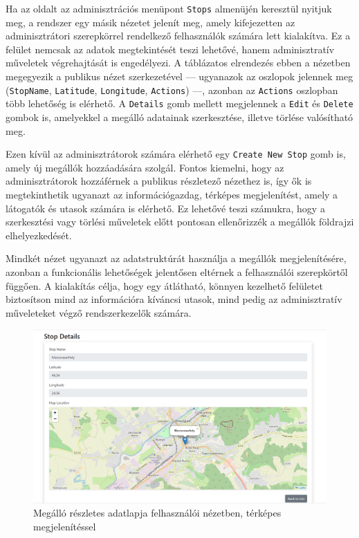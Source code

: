 Ha az oldalt az adminisztrációs menüpont \texttt{Stops} almenüjén keresztül nyitjuk meg, a rendszer egy másik nézetet jelenít meg, amely kifejezetten az adminisztrátori szerepkörrel rendelkező felhasználók számára lett kialakítva. Ez a felület nemcsak az adatok megtekintését teszi lehetővé, hanem adminisztratív műveletek végrehajtását is engedélyezi. A táblázatos elrendezés ebben a nézetben megegyezik a publikus nézet szerkezetével — ugyanazok az oszlopok jelennek meg (\texttt{StopName}, \texttt{Latitude}, \texttt{Longitude}, \texttt{Actions}) —, azonban az \texttt{Actions} oszlopban több lehetőség is elérhető. A \texttt{Details} gomb mellett megjelennek a \texttt{Edit} és \texttt{Delete} gombok is, amelyekkel a megálló adatainak szerkesztése, illetve törlése valósítható meg.

Ezen kívül az adminisztrátorok számára elérhető egy \texttt{Create New Stop} gomb is, amely új megállók hozzáadására szolgál. Fontos kiemelni, hogy az adminisztrátorok hozzáférnek a publikus részletező nézethez is, így ők is megtekinthetik ugyanazt az információgazdag, térképes megjelenítést, amely a látogatók és utasok számára is elérhető. Ez lehetővé teszi számukra, hogy a szerkesztési vagy törlési műveletek előtt pontosan ellenőrizzék a megállók földrajzi elhelyezkedését.

Mindkét nézet ugyanazt az adatstruktúrát használja a megállók megjelenítésére, azonban a funkcionális lehetőségek jelentősen eltérnek a felhasználói szerepkörtől függően. A kialakítás célja, hogy egy átlátható, könnyen kezelhető felületet biztosítson mind az információra kíváncsi utasok, mind pedig az adminisztratív műveleteket végző rendszerkezelők számára.

\begin{figure}[H]
    \centering
    \includegraphics[width=1\textwidth]{Szakdolgozat/Mellekletek/StopDetail.PNG}
    \caption{Megálló részletes adatlapja felhasználói nézetben, térképes megjelenítéssel}
    \label{fig:stop-detail-user}
\end{figure}

